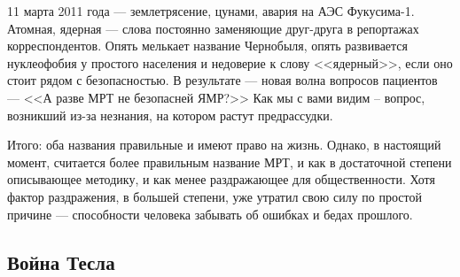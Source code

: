 11 марта 2011 года --- землетрясение, цунами, авария на АЭС Фукусима-1. Атомная, ядерная --- слова постоянно заменяющие друг-друга в репортажах корреспондентов. Опять мелькает название Чернобыля, опять развивается нуклеофобия у простого населения и недоверие к слову <<ядерный>>, если оно стоит рядом с безопасностью. В результате --- новая волна вопросов пациентов --- <<А разве МРТ не безопасней ЯМР?>> Как мы с вами видим -- вопрос, возникший из-за незнания, на котором растут предрассудки. 

Итого: оба названия правильные и имеют право на жизнь. Однако, в настоящий момент, считается более правильным название МРТ, и как в достаточной степени описывающее методику, и как менее раздражающее для общественности. Хотя фактор раздражения, в большей степени, уже утратил свою силу по простой причине --- способности человека забывать об ошибках и бедах прошлого. 

\subsection{Война Тесла}





